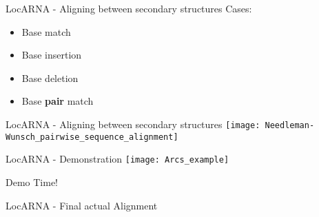 \begin{frame}[c]{LocARNA - Aligning between secondary structures}
    \Large
    Cases:
    \begin{itemize}[<+(1)->]
    \item Base match
    \item Base insertion
    \item Base deletion
    \item Base \textbf{pair} match
    \end{itemize}
\end{frame}



\begin{frame}[c]{LocARNA - Aligning between secondary structures}
    \center
    \texttt{[image: Needleman-Wunsch\_pairwise\_sequence\_alignment]}
\end{frame}


\begin{frame}[c]{LocARNA - Demonstration}
    \center
    \texttt{[image: Arcs\_example]}
\end{frame}


\begin{frame}[standout]
    Demo Time!
\end{frame}

\begin{frame}[c]{LocARNA - Final actual Alignment}
    \center
    \begin{overprint}
    \end{overprint}
\end{frame}





